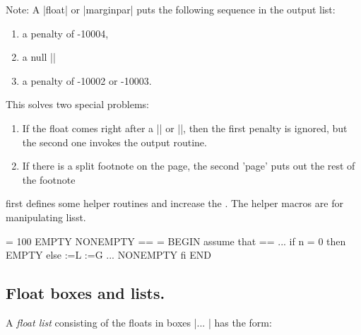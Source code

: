 Note: A |float| or |marginpar| puts the following sequence in the output
list: 

\begin{enumerate}
\item a penalty of -10004,

\item a null |\vbox|

\item a penalty of -10002 or -10003.
\end{enumerate}

This solves two special problems:

\begin{enumerate}
\item If the float comes right after a |\newpage| or |\clearpage|,
then the first penalty is ignored, but the second one
invokes the output routine.

\item If there is a split footnote on the page, the second 'page'
puts out the rest of the footnote
\end{enumerate}

\latex first defines some helper routines and increase the . The helper macros are for
manipulating lisst.

\begin{teX}
 \maxdeadcycles = 100
 \let\@elt\relax
 \def\@next#1#2#3#4{\ifx#2\@empty #4\else
   \expandafter\@xnext #2\@@#1#2#3\fi}
   \@next \CS \LIST {NONEMPTY}{EMPTY} == %
\@elt = \relax
 BEGIN assume that \LIST == \@elt {} ... \@elt \Bn
 if n = 0
 then EMPTY
 else 
   \CS :=L 
   \LIST :=G \@elt {} ... \@elt \Bn
   NONEMPTY
 fi
END
\end{teX}


\begin{teX}
11 \def\@xnext \@elt #1#2\@@#3#4{\def#3{#1}\gdef#4{#2}}

12 \def\@testfalse{\global\let\if@test\iffalse}
13 \def\@testtrue {\global\let\if@test\iftrue}
14 \@testfalse}
   }

15 \def\@bitor#1#2{\@testfalse {\let\@elt\@xbitor
16   \@tempcnta #1\relax #2}}

17 \def\@xbitor #1{\@tempcntb \count#1
18    \ifnum \@tempcnta =\z@
19    \else
20      \divide\@tempcntb\@tempcnta
21    \ifodd\@tempcntb \@testtrue\fi
22   \fi}
\end{teX}


\subsection{Float boxes and lists.} 
A \textit{float list} consisting of the 
floats in boxes |\boxa ... \boxN| has
the form:


